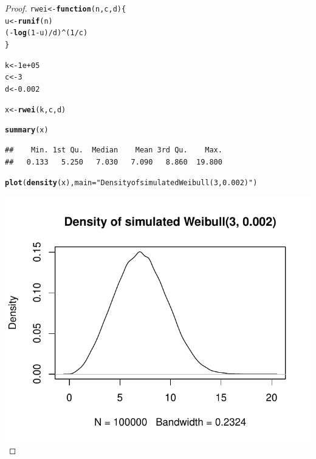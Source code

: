 \documentclass[letterpaper, 12pt]{article}\usepackage[]{graphicx}\usepackage[]{color}
\makeatletter
\def\maxwidth{ %
  \ifdim\Gin@nat@width>\linewidth
    \linewidth
  \else
    \Gin@nat@width
  \fi
}
\newcommand{\hlnum}[1]{\textcolor[rgb]{0.686,0.059,0.569}{#1}}%
\newcommand{\hlstr}[1]{\textcolor[rgb]{0.192,0.494,0.8}{#1}}%
\newcommand{\hlopt}[1]{\textcolor[rgb]{0,0,0}{#1}}%
\newcommand{\hlstd}[1]{\textcolor[rgb]{0.345,0.345,0.345}{#1}}%
\newcommand{\hlkwa}[1]{\textcolor[rgb]{0.161,0.373,0.58}{\textbf{#1}}}%
\newcommand{\hlkwb}[1]{\textcolor[rgb]{0.69,0.353,0.396}{#1}}%
\newcommand{\hlkwc}[1]{\textcolor[rgb]{0.333,0.667,0.333}{#1}}%
\newcommand{\hlkwd}[1]{\textcolor[rgb]{0.737,0.353,0.396}{\textbf{#1}}}%
\newenvironment{kframe}{%
 \def\at@end@of@kframe{}%
 \ifinner\ifhmode%
  \def\at@end@of@kframe{\end{minipage}}%
  \begin{minipage}{\columnwidth}%
 \fi\fi%
 \def\FrameCommand##1{\hskip\@totalleftmargin \hskip-\fboxsep
 \colorbox{shadecolor}{##1}\hskip-\fboxsep
     \hskip-\linewidth \hskip-\@totalleftmargin \hskip\columnwidth}%
 \MakeFramed {\advance\hsize-\width
   \@totalleftmargin\z@ \linewidth\hsize
   \@setminipage}}%
 {\par\unskip\endMakeFramed%
 \at@end@of@kframe}
\newenvironment{knitrout}{}{} %
\makeatother
\begin{document}
\begin{enumerate}[(i)]
\begin{proof}
\begin{knitrout}
\color{fgcolor}\begin{kframe}
\begin{alltt}
\hlstd{rwei} \hlkwb{<-} \hlkwa{function}\hlstd{(}\hlkwc{n}\hlstd{,} \hlkwc{c}\hlstd{,} \hlkwc{d}\hlstd{) \{}
    \hlstd{u} \hlkwb{<-} \hlkwd{runif}\hlstd{(n)}
    \hlstd{(}\hlopt{-}\hlkwd{log}\hlstd{(}\hlnum{1} \hlopt{-} \hlstd{u)}\hlopt{/}\hlstd{d)}\hlopt{^}\hlstd{(}\hlnum{1}\hlopt{/}\hlstd{c)}
\hlstd{\}}

\hlstd{k} \hlkwb{<-} \hlnum{1e+05}
\hlstd{c} \hlkwb{<-} \hlnum{3}
\hlstd{d} \hlkwb{<-} \hlnum{0.002}

\hlstd{x} \hlkwb{<-} \hlkwd{rwei}\hlstd{(k, c, d)}

\hlkwd{summary}\hlstd{(x)}
\end{alltt}
\begin{verbatim}
##    Min. 1st Qu.  Median    Mean 3rd Qu.    Max. 
##   0.133   5.250   7.030   7.090   8.860  19.800
\end{verbatim}
\begin{alltt}
\hlkwd{plot}\hlstd{(}\hlkwd{density}\hlstd{(x),} \hlkwc{main} \hlstd{=} \hlstr{"Density of simulated Weibull(3, 0.002)"}\hlstd{)}
\end{alltt}
\end{kframe}
\includegraphics[width=\maxwidth]{figure/rwei} 

\end{knitrout}

\end{proof}


\end{enumerate}
\end{document}
